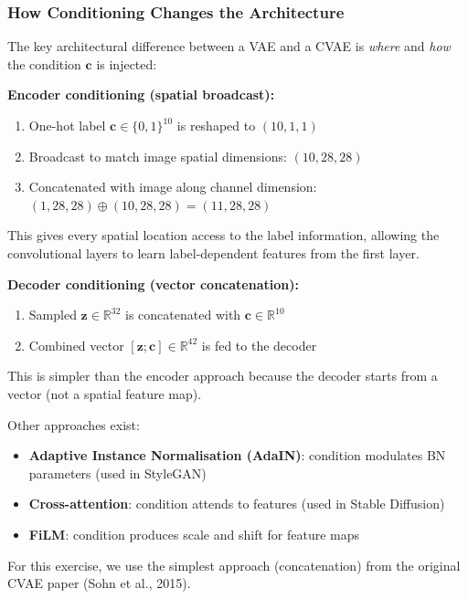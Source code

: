 \documentclass[11pt,a4paper]{article}
\begin{document}
\subsubsection{How Conditioning Changes the Architecture}

The key architectural difference between a VAE and a CVAE is \emph{where} and \emph{how} the condition $\mathbf{c}$ is injected:

\begin{concept}
\textbf{Encoder conditioning (spatial broadcast):}
\begin{enumerate}
    \item One-hot label $\mathbf{c} \in \{0,1\}^{10}$ is reshaped to $(10, 1, 1)$
    \item Broadcast to match image spatial dimensions: $(10, 28, 28)$
    \item Concatenated with image along channel dimension: $(1, 28, 28) \oplus (10, 28, 28) = (11, 28, 28)$
\end{enumerate}
This gives every spatial location access to the label information, allowing the convolutional layers to learn label-dependent features from the first layer.

\textbf{Decoder conditioning (vector concatenation):}
\begin{enumerate}
    \item Sampled $\mathbf{z} \in \mathbb{R}^{32}$ is concatenated with $\mathbf{c} \in \mathbb{R}^{10}$
    \item Combined vector $[\mathbf{z}; \mathbf{c}] \in \mathbb{R}^{42}$ is fed to the decoder
\end{enumerate}
This is simpler than the encoder approach because the decoder starts from a vector (not a spatial feature map).
\end{concept}

\begin{note}
Other approaches exist:
\begin{itemize}
    \item \textbf{Adaptive Instance Normalisation (AdaIN)}: condition modulates BN parameters (used in StyleGAN)
    \item \textbf{Cross-attention}: condition attends to features (used in Stable Diffusion)
    \item \textbf{FiLM}: condition produces scale and shift for feature maps
\end{itemize}
For this exercise, we use the simplest approach (concatenation) from the original CVAE paper (Sohn et al., 2015).
\end{note}
\end{document}
